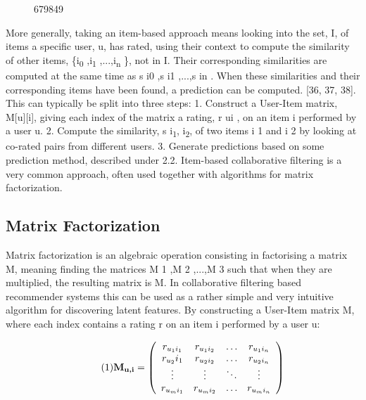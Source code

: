 \begin{figure}[H]
    {}
    \caption{679849}
\end{figure}

More generally, taking an item-based approach means looking into the set, I, of items a specific user, u, has rated, using their context to compute the similarity of other items, \{i\textsubscript{0} ,i\textsubscript{1} ,...,i\textsubscript{n} \}, not in I. Their corresponding similarities are computed at the same time as {s i0 ,s i1 ,...,s in }. When these similarities and their corresponding items have been found, a prediction can be computed. [36, 37, 38]. 
This can typically be split into three steps: 
1. Construct a User-Item matrix, M[u][i], giving each index of the matrix a rating, r ui , on an item i performed by a user u. 
2. Compute the similarity, s i\textsubscript{1}, i\textsubscript{2}, of two items i 1 and i 2 by looking at co-rated pairs from different users.
3. Generate predictions based on some prediction method, described under 2.2. Item-based collaborative filtering is a very common approach, often used together with algorithms for matrix factorization.

\subsection{Matrix Factorization}
Matrix factorization is an algebraic operation consisting in factorising a matrix M, meaning finding the matrices M 1 ,M 2 ,...,M 3 such that when they are multiplied, the resulting matrix is M. In collaborative filtering based recommender systems this can be used as a rather simple and very intuitive algorithm for discovering latent features. By constructing a User-Item matrix M, where each index contains a rating r on an item i performed by a user u:

\[  
\label{eq:ratingmatrix} \tag{1}
\textbf{M\textsubscript{u,i}} = \left(
\begin{array}{cccc}
r_{{u_1}{i_1}}&r_{{u_1}{i_2}}& \ldots&r_{{u_1}{i_n}} \\
r_{u_2}{i_1}&r_{{u_2}{i_2}}& \ldots&r_{{u_2}{i_n}} \\
\vdots & \vdots & \ddots & \vdots \\
r_{{u_m}{i_1}}&r_{{u_m}{i_2}}& \ldots&r_{{u_m}{i_n}}
\end{array}
\right)
\]

